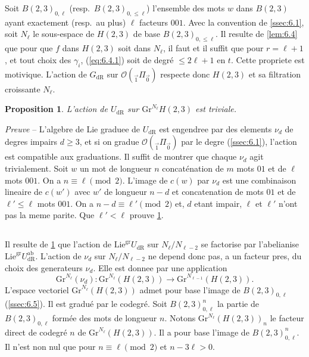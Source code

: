 \documentclass[11pt,a4paper]{article}
\theoremstyle{plain}
\newtheorem{proposition}[theorem]{Proposition}
\theoremstyle{definition}
\newcommand{\dR}{\mathrm{dR}}
\newcommand{\gr}{\mathrm{gr}}
\newcommand{\Gr}{\mathrm{Gr}}
\newcommand{\ab}{\mathrm{ab}}
\begin{document}
Soit $B(2,3)_{0,\ell}$ (resp.~$B(2,3)_{0,\leq \ell}$) l'ensemble des mots $w$ dans $B(2,3)$ ayant exactement (resp.~au plus) $\ell$ facteurs $001$. Avec la convention de \ref{ssec:6.1}, soit $N_{\ell}$ le sous-espace de $H(2,3)$ de base $B(2,3)_{0,\leq \ell}$. Il resulte de \ref{lem:6.4} que pour que $f$ dans $H(2,3)$ soit dans $N_{\ell}$, il faut et il suffit que pour $r = \ell + 1$, et tout choix des $\gamma_i$, (\ref{eq:6.4.1}) soit de degr\'e $\leq 2\ell + 1$ en $t$. Cette propriete est motivique. L'action de $G_{\dR}$ sur $\mathcal{O}({}_{\vec{1}}\Pi_{\vec{0}})$ respecte donc $H(2,3)$ et sa filtration croissante $N_{\ell}$.

\begin{proposition}\label{prop:6.6}
L'action de $U_{\dR}$ sur $\Gr^{N_{\ell}} H(2,3)$ est triviale.
\end{proposition}

\noindent \textit{Preuve} -- L'algebre de Lie graduee de $U_{\dR}$ est engendree par des elements $\nu_d$ de degres impairs $d \geq 3$, et si on gradue $\mathcal{O}({}_{\vec{1}}\Pi_{\vec{0}})$ par le degre (\ref{ssec:6.1}), l'action est compatible aux graduations. Il suffit de montrer que chaque $\nu_d$ agit trivialement. Soit $w$ un mot de longueur $n$ concat\'enation de $m$ mots $01$ et de $\ell$ mots $001$. On a $n \equiv \ell \pmod{2}$. L'image de $c(w)$ par $\nu_d$ est une combinaison lineaire de $c(w')$ avec $w'$ de longueur $n - d$ et concatenation de mots $01$ et de $\ell' \leq \ell$ mots $001$. On a $n - d \equiv \ell' \pmod{2}$ et, $d$ etant impair, $\ell$ et $\ell'$ n'ont pas la meme parite. Que $\ell' < \ell$ prouve \ref{prop:6.6}.

\subsection{}\label{ssec:6.7}

Il resulte de \ref{prop:6.6} que l'action de $\mathrm{Lie}^{\gr} U_{\dR}$ sur $N_{\ell}/N_{\ell-2}$ se factorise par l'abelianise $\mathrm{Lie}^{\gr} U_{\dR}^{\ab}$. L'action de $\nu_d$ sur $N_{\ell}/N_{\ell-2}$ ne depend donc pas, a un facteur pres, du choix des generateurs $\nu_d$. Elle est donnee par une application
\begin{equation}\label{eq:6.7.1}
\Gr^{N_{\ell}}(\nu_d): \Gr^{N_{\ell}}(H(2,3)) \to \Gr^{N_{\ell-1}}(H(2,3)).
\end{equation}
L'espace vectoriel $\Gr^{N_{\ell}}(H(2,3))$ admet pour base l'image de $B(2,3)_{0,\ell}$ (\ref{ssec:6.5}). Il est gradu\'e par le codegr\'e. Soit $B(2,3)_{0,\ell}^n$ la partie de $B(2,3)_{0,\ell}$ form\'ee des mots de longueur $n$. Notons $\Gr^{N_{\ell}}(H(2,3))_n$ le facteur direct de codegr\'e $n$ de $\Gr^{N_{\ell}}(H(2,3))$. Il a pour base l'image de $B(2,3)_{0,\ell}^n$. Il n'est non nul que pour $n \equiv \ell \pmod{2}$ et $n - 3\ell > 0$.
\end{document}
